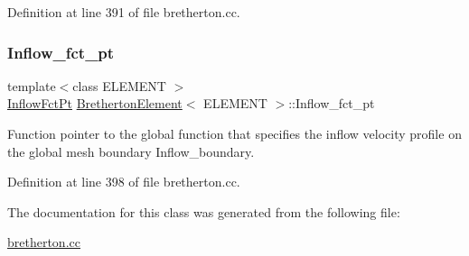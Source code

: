 Definition at line 391 of file bretherton.\+cc.

\mbox{\label{classBrethertonElement_a6ded0faba9d7fcfe96834c56af461977}} 
\subsubsection{\texorpdfstring{Inflow\+\_\+fct\+\_\+pt}{Inflow\_fct\_pt}}
{\footnotesize\ttfamily template$<$class E\+L\+E\+M\+E\+NT $>$ \\
\hyperlink{classBrethertonElement_a313d868ce6fbd8df07b0360db25133ce}{Inflow\+Fct\+Pt} \hyperlink{classBrethertonElement}{Bretherton\+Element}$<$ E\+L\+E\+M\+E\+NT $>$\+::Inflow\+\_\+fct\+\_\+pt\hspace{0.3cm}{\ttfamily [private]}}



Function pointer to the global function that specifies the inflow velocity profile on the global mesh boundary Inflow\+\_\+boundary. 



Definition at line 398 of file bretherton.\+cc.



The documentation for this class was generated from the following file\+:\begin{DoxyCompactItemize}
\item 
\hyperlink{bretherton_8cc}{bretherton.\+cc}\end{DoxyCompactItemize}
